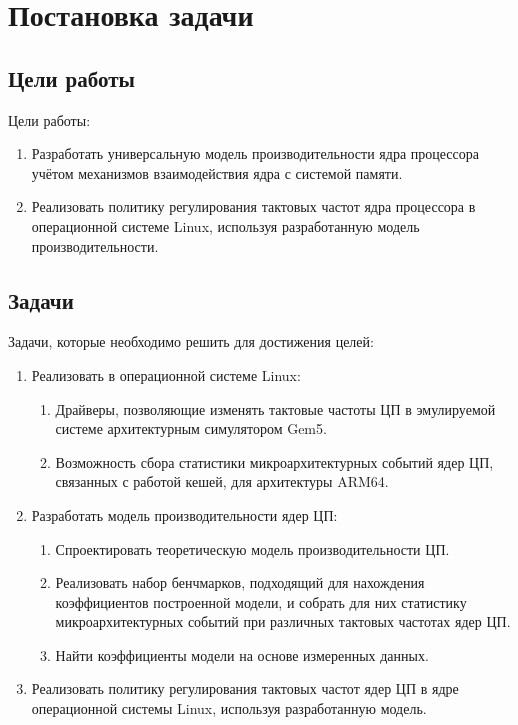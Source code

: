 \section{Постановка задачи}
\label{sec:Section1} 

\subsection{Цели работы}

    Цели работы:
    \begin{enumerate}
        \item Разработать универсальную модель производительности ядра процессора учётом
        механизмов взаимодействия ядра с системой памяти.
        \item Реализовать политику регулирования тактовых частот ядра процессора в операционной
        системе Linux, используя разработанную модель производительности.
    \end{enumerate}

\subsection{Задачи}

    Задачи, которые необходимо решить для достижения целей:
    \begin{enumerate}
        \item Реализовать в операционной системе Linux:
        \begin{enumerate}
            \item Драйверы, позволяющие изменять тактовые частоты ЦП в эмулируемой системе
            архитектурным симулятором Gem5.
            \item Возможность сбора статистики микроархитектурных событий ядер ЦП, связанных с работой
            кешей, для архитектуры ARM64.
        \end{enumerate}
        \item Разработать модель производительности ядер ЦП:
        \begin{enumerate}
            \item Спроектировать теоретическую модель производительности ЦП.
            \item Реализовать набор бенчмарков, подходящий для нахождения коэффициентов
                построенной модели, и собрать для них статистику микроархитектурных событий при
                различных тактовых частотах ядер ЦП.
            \item Найти коэффициенты модели на основе измеренных данных.
        \end{enumerate}
        \item Реализовать политику регулирования тактовых частот ядер ЦП в ядре операционной системы
            Linux, используя разработанную модель.
    \end{enumerate}
\newpage
